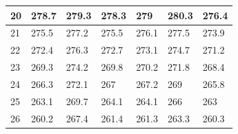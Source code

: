 \documentclass[12pt,hyperref,a4paper,UTF8]{ctexart}
\begin{document}
\begin{table}[htp]
\begin{tabular}{|l|l|l|l|l|l|l|}
20     & 278.7  & 279.3  & 278.3  & 279    & 280.3  & 276.4  \\ \hline
21     & 275.5  & 277.2  & 275.5  & 276.1  & 277.5  & 273.9  \\ \hline
22     & 272.4  & 276.3  & 272.7  & 273.1  & 274.7  & 271.2  \\ \hline
23     & 269.3  & 274.2  & 269.8  & 270.2  & 271.8  & 268.4  \\ \hline
24     & 266.3  & 272.1  & 267    & 267.2  & 269    & 265.8  \\ \hline
25     & 263.1  & 269.7  & 264.1  & 264.1  & 266    & 263    \\ \hline
26     & 260.2  & 267.4  & 261.4  & 261.3  & 263.3  & 260.3  \\ \hline








\end{tabular}
\end{table}
\end{document}
